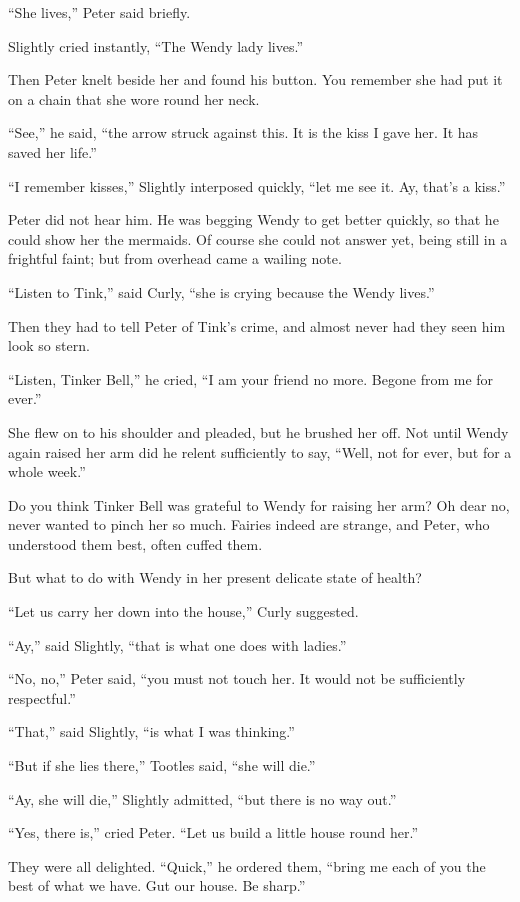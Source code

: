 ``She lives,'' Peter said briefly.

Slightly cried instantly, ``The Wendy lady lives.''

Then Peter knelt beside her and found his button. You remember she had
put it on a chain that she wore round her neck.

``See,'' he said, ``the arrow struck against this. It is the kiss I gave
her. It has saved her life.''

``I remember kisses,'' Slightly interposed quickly, ``let me see it. Ay,
that's a kiss.''

Peter did not hear him. He was begging Wendy to get better quickly, so
that he could show her the mermaids. Of course she could not answer
yet, being still in a frightful faint; but from overhead came a wailing
note.

``Listen to Tink,'' said Curly, ``she is crying because the Wendy lives.''

Then they had to tell Peter of Tink's crime, and almost never had they
seen him look so stern.

``Listen, Tinker Bell,'' he cried, ``I am your friend no more. Begone from
me for ever.''

She flew on to his shoulder and pleaded, but he brushed her off. Not
until Wendy again raised her arm did he relent sufficiently to say,
``Well, not for ever, but for a whole week.''

Do you think Tinker Bell was grateful to Wendy for raising her arm? Oh
dear no, never wanted to pinch her so much. Fairies indeed are strange,
and Peter, who understood them best, often cuffed them.

But what to do with Wendy in her present delicate state of health?

``Let us carry her down into the house,'' Curly suggested.

``Ay,'' said Slightly, ``that is what one does with ladies.''

``No, no,'' Peter said, ``you must not touch her. It would not be
sufficiently respectful.''

``That,'' said Slightly, ``is what I was thinking.''

``But if she lies there,'' Tootles said, ``she will die.''

``Ay, she will die,'' Slightly admitted, ``but there is no way out.''

``Yes, there is,'' cried Peter. ``Let us build a little house round her.''

They were all delighted. ``Quick,'' he ordered them, ``bring me each of
you the best of what we have. Gut our house. Be sharp.''

